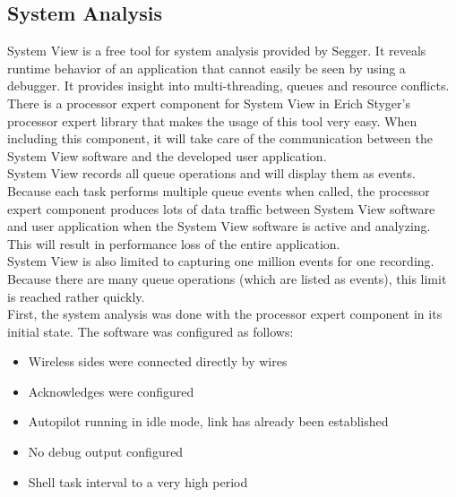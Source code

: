 \subsection{System Analysis}
System View is a free tool for system analysis provided by Segger. It reveals runtime behavior of an application that cannot easily be seen by using a debugger. It provides insight into multi-threading, queues and resource conflicts.\\
There is a processor expert component for System View in Erich Styger's processor expert library that makes the usage of this tool very easy. When including this component, it will take care of the communication between the System View software and the developed user application.\\
System View records all queue operations and will display them as events. Because each task performs multiple queue events when called, the processor expert component produces lots of data traffic between System View software and user application when the System View software is active and analyzing. This will result in performance loss of the entire application.\\
System View is also limited to capturing one million events for one recording. Because there are many queue operations (which are listed as events), this limit is reached rather quickly.\\
First, the system analysis was done with the processor expert component in its initial state. The software was configured as follows:
\begin{itemize}
    \item Wireless sides were connected directly by wires
    \item Acknowledges were configured
    \item Autopilot running in idle mode, link has already been established
    \item No debug output configured
    \item Shell task interval to a very high period
\end{itemize}
%
%
%
